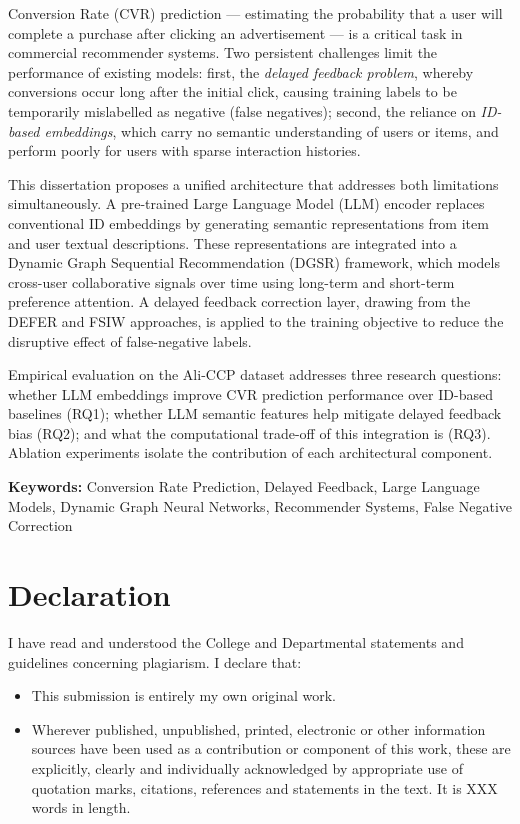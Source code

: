 \documentclass[12pt]{report}
\numberwithin{figure}{chapter}
\numberwithin{table}{chapter}
\numberwithin{equation}{chapter}
\begin{document}
Conversion Rate (CVR) prediction — estimating the probability that a user will complete a purchase after clicking an advertisement — is a critical task in commercial recommender systems. Two persistent challenges limit the performance of existing models: first, the \textit{delayed feedback problem}, whereby conversions occur long after the initial click, causing training labels to be temporarily mislabelled as negative (false negatives); second, the reliance on \textit{ID-based embeddings}, which carry no semantic understanding of users or items, and perform poorly for users with sparse interaction histories.

This dissertation proposes a unified architecture that addresses both limitations simultaneously. A pre-trained Large Language Model (LLM) encoder replaces conventional ID embeddings by generating semantic representations from item and user textual descriptions. These representations are integrated into a Dynamic Graph Sequential Recommendation (DGSR) framework, which models cross-user collaborative signals over time using long-term and short-term preference attention. A delayed feedback correction layer, drawing from the DEFER and FSIW approaches, is applied to the training objective to reduce the disruptive effect of false-negative labels.

Empirical evaluation on the Ali-CCP dataset addresses three research questions: whether LLM embeddings improve CVR prediction performance over ID-based baselines (RQ1); whether LLM semantic features help mitigate delayed feedback bias (RQ2); and what the computational trade-off of this integration is (RQ3). Ablation experiments isolate the contribution of each architectural component.

\vspace{1cm}
\textbf{Keywords:} Conversion Rate Prediction, Delayed Feedback, Large Language Models, Dynamic Graph Neural Networks, Recommender Systems, False Negative Correction

\chapter*{Declaration}
\thispagestyle{fancy}

I have read and understood the College and Departmental statements and guidelines concerning plagiarism. I declare that:

\begin{itemize}
    \item This submission is entirely my own original work.
    \item Wherever published, unpublished, printed, electronic or other information sources have been used as a contribution or component of this work, these are explicitly, clearly and individually acknowledged by appropriate use of quotation marks, citations, references and statements in the text. It is XXX words in length.
\end{itemize}
\end{document}
